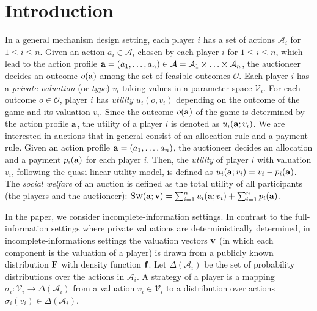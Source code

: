 \section{Introduction}	\label{sec:welfare}
%
In a general mechanism design setting, each player $i$ has a set of actions $\mathcal{A}_{i}$
for $1 \leq i \leq n$. Given an action $a_{i} \in \mathcal{A}_{i}$ chosen by each player $i$ for $1 \leq i \leq n$, which lead to the 
action profile $\mathbf{a} = (a_{1}, \ldots, a_{n}) \in \mathcal{A} = \mathcal{A}_{1} \times \ldots \times \mathcal{A}_{n}$, 
the auctioneer decides an outcome $o(\mathbf{a})$ among the set of feasible outcomes $\mathcal{O}$. 
Each player $i$ has a \emph{private valuation} (or \emph{type}) $v_{i}$ taking values in a parameter space $\mathcal{V}_{i}$.
For each outcome $o \in \mathcal{O}$, player $i$ has \emph{utility} $u_{i}(o,v_{i})$ depending on
the outcome of the game and its valuation $v_{i}$. 
Since the outcome $o(\mathbf{a})$ of the game is determined by the action profile $\mathbf{a}$, 
the utility of a player $i$ is denoted as $u_{i}(\mathbf{a};v_{i})$. 
We are interested in auctions that in general consist of an allocation rule and a payment rule.
Given an action profile $\mathbf{a} = (a_{1}, \ldots, a_{n})$, the auctioneer decides an allocation 
and a payment $p_{i}(\mathbf{a})$ for each player $i$. 
Then, the \emph{utility} of player $i$ with valuation $v_{i}$, following the quasi-linear utility model, 
is defined as $u_{i}(\mathbf{a};v_{i}) = v_{i} - p_{i}(\mathbf{a})$. 
The \emph{social welfare} of an auction is defined as the total utility of all participants (the players and the auctioneer):  
$\textsc{Sw}(\mathbf{a};\mathbf{v}) =  \sum_{i=1}^{n} u_{i}(\mathbf{a};v_{i}) + \sum_{i=1}^{n} p_{i}(\mathbf{a})$. 

In the paper, we consider incomplete-information settings. 
In contrast to the full-information settings where private valuations are deterministically determined, in 
incomplete-informations settings the valuation vectors $\mathbf{v}$ (in which each component is the valuation of a player) 
is drawn from a publicly known distribution $\mathbf{F}$ with density function $\mathbf{f}$. 
Let $\Delta(\mathcal{A}_{i})$ be the set of probability distributions over the actions 
in $\mathcal{A}_{i}$.  A strategy of a player is a mapping $\sigma_{i}: \mathcal{V}_{i} \rightarrow \Delta(\mathcal{A}_{i})$
from a valuation $v_{i} \in \mathcal{V}_{i}$ to a distribution over actions $\sigma_{i}(v_{i}) \in \Delta(\mathcal{A}_{i})$.

